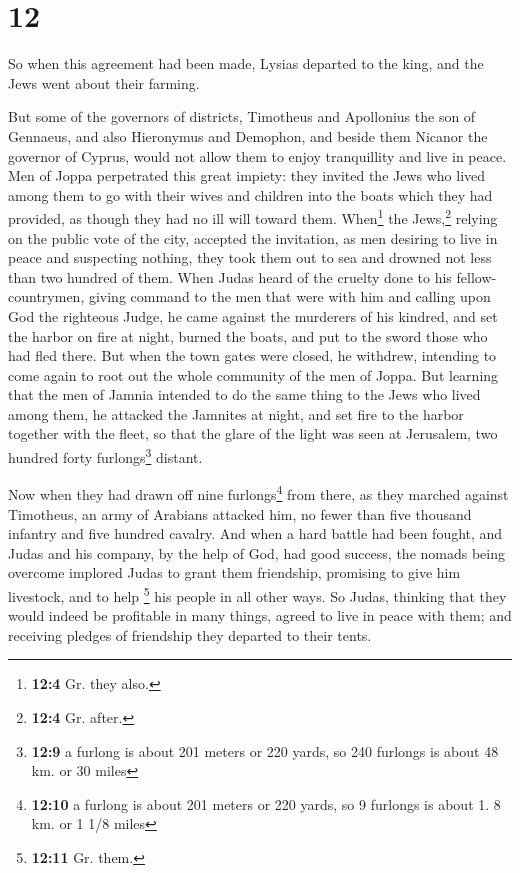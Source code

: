 \hypertarget{section-11}{%
\section{12}\label{section-11}}

 So when this agreement had been made, Lysias departed to
the king, and the Jews went about their farming.

 But some of the governors of districts, Timotheus and
Apollonius the son of Gennaeus, and also Hieronymus and Demophon, and
beside them Nicanor the governor of Cyprus, would not allow them to
enjoy tranquillity and live in peace.  Men of Joppa
perpetrated this great impiety: they invited the Jews who lived among
them to go with their wives and children into the boats which they had
provided, as though they had no ill will toward them. 
When\footnote{\textbf{12:4} Gr. they also.} the Jews,\footnote{\textbf{12:4}
  Gr. after.} relying on the public vote of the city, accepted the
invitation, as men desiring to live in peace and suspecting nothing,
they took them out to sea and drowned not less than two hundred of them.
 When Judas heard of the cruelty done to his
fellow-countrymen, giving command to the men that were with him
 and calling upon God the righteous Judge, he came against
the murderers of his kindred, and set the harbor on fire at night,
burned the boats, and put to the sword those who had fled there.
 But when the town gates were closed, he withdrew,
intending to come again to root out the whole community of the men of
Joppa.  But learning that the men of Jamnia intended to do
the same thing to the Jews who lived among them,  he
attacked the Jamnites at night, and set fire to the harbor together with
the fleet, so that the glare of the light was seen at Jerusalem, two
hundred forty furlongs\footnote{\textbf{12:9} a furlong is about 201
  meters or 220 yards, so 240 furlongs is about 48 km. or 30 miles}
distant.

 Now when they had drawn off nine furlongs\footnote{\textbf{12:10}
  a furlong is about 201 meters or 220 yards, so 9 furlongs is about 1.
  8 km. or 1 1/8 miles} from there, as they marched against Timotheus,
an army of Arabians attacked him, no fewer than five thousand infantry
and five hundred cavalry.  And when a hard battle had
been fought, and Judas and his company, by the help of God, had good
success, the nomads being overcome implored Judas to grant them
friendship, promising to give him livestock, and to help \footnote{\textbf{12:11}
  Gr. them.} his people in all other ways.  So Judas,
thinking that they would indeed be profitable in many things, agreed to
live in peace with them; and receiving pledges of friendship they
departed to their tents.

